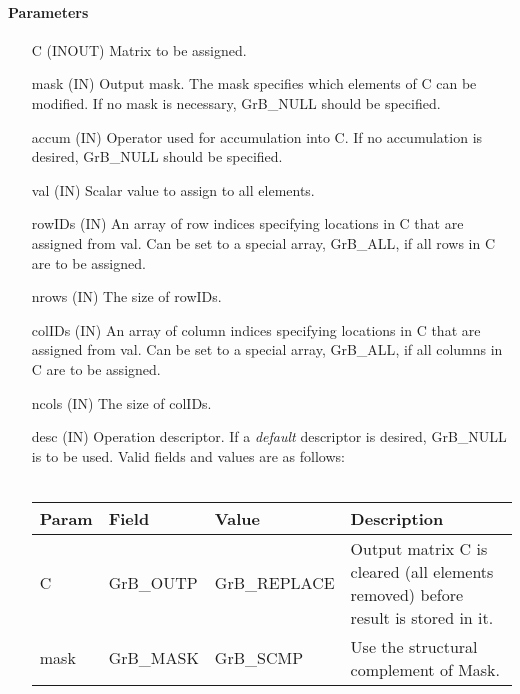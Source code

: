 \paragraph{Parameters}

\begin{itemize}[leftmargin=1.1in]
    \item[{\sf C}]    ({\sf INOUT}) Matrix to be assigned.

    \item[{\sf mask}] ({\sf IN}) Output mask. The mask specifies which elements
    of {\sf C} can be modified. If no mask is necessary, {\sf GrB\_NULL} should 
    be specified.

    \item[{\sf accum}] ({\sf IN}) Operator used for accumulation into {\sf C}.  
    If no accumulation
                        is desired, {\sf GrB\_NULL} should be specified.

    \item[{\sf val}]    ({\sf IN}) Scalar value to assign to all elements.
    \item[{\sf rowIDs}] ({\sf IN}) An array of row indices specifying locations 
                              in {\sf C} that are assigned from {\sf val}. Can be set
                              to a special array, {\sf GrB\_ALL}, if all rows
                              in {\sf C} are to be assigned.
    \item[{\sf nrows}]  ({\sf IN}) The size of {\sf rowIDs}.
    \item[{\sf colIDs}] ({\sf IN}) An array of column indices specifying locations
                              in {\sf C} that are assigned from {\sf val}. Can be set
                              to a special array, {\sf GrB\_ALL}, if all columns
                              in {\sf C} are to be assigned.
    \item[{\sf ncols}]  ({\sf IN}) The size of {\sf colIDs}.


    \item[{\sf desc}]   ({\sf IN}) Operation descriptor. If a
    \emph{default} descriptor is desired, {\sf GrB\_NULL} is to be
    used. Valid fields and values are as follows: \\ ~\\
    \begin{tabular}{lllp{2.5in}}
    Param & Field  & Value & Description \\
    \hline
    {\sf C}    & {\sf GrB\_OUTP} & {\sf GrB\_REPLACE} & Output matrix {\sf C} is cleared (all elements removed) before result is stored in it.\\
    {\sf mask} & {\sf GrB\_MASK} & {\sf GrB\_SCMP} & Use the structural complement of {\sf Mask}. \\
    \end{tabular}

\end{itemize}

